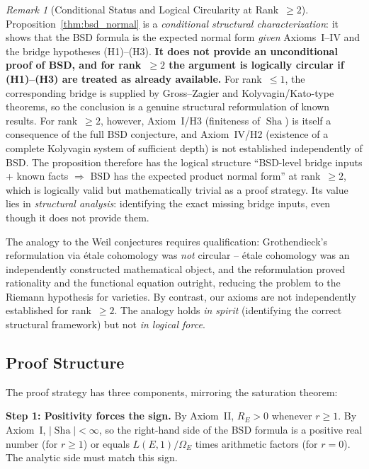 \documentclass[aps,prd,twocolumn,superscriptaddress,nofootinbib,floatfix]{revtex4-2}
\theoremstyle{definition}
\theoremstyle{remark}
\newtheorem{remark}[theorem]{Remark}
\DeclareMathOperator{\Sha}{Sha}
\begin{document}
\begin{remark}[Conditional Status and Logical Circularity at Rank~$\geq 2$]
\label{rem:conditional_status}
Proposition~\ref{thm:bsd_normal} is a \textit{conditional structural characterization}: it shows that the BSD formula is the expected normal form \textit{given} Axioms~I--IV and the bridge hypotheses (H1)--(H3). \textbf{It does not provide an unconditional proof of BSD, and for rank~$\geq 2$ the argument is logically circular if (H1)--(H3) are treated as already available.} For rank~$\leq 1$, the corresponding bridge is supplied by Gross--Zagier and Kolyvagin/Kato-type theorems, so the conclusion is a genuine structural reformulation of known results. For rank~$\geq 2$, however, Axiom~I/H3 (finiteness of $\Sha$) is itself a consequence of the full BSD conjecture, and Axiom~IV/H2 (existence of a complete Kolyvagin system of sufficient depth) is not established independently of BSD. The proposition therefore has the logical structure ``BSD-level bridge inputs + known facts $\Rightarrow$ BSD has the expected product normal form'' at rank~$\geq 2$, which is logically valid but mathematically trivial as a proof strategy. Its value lies in \textit{structural analysis}: identifying the exact missing bridge inputs, even though it does not provide them.

The analogy to the Weil conjectures requires qualification: Grothendieck's reformulation via étale cohomology was \textit{not} circular -- étale cohomology was an independently constructed mathematical object, and the reformulation proved rationality and the functional equation outright, reducing the problem to the Riemann hypothesis for varieties. By contrast, our axioms are not independently established for rank~$\geq 2$. The analogy holds \textit{in spirit} (identifying the correct structural framework) but not \textit{in logical force}.
\end{remark}

\subsection{Proof Structure}

The proof strategy has three components, mirroring the saturation theorem:

\textbf{Step 1: Positivity forces the sign.} By Axiom~II, $R_E > 0$ whenever $r \geq 1$. By Axiom~I, $|\Sha| < \infty$, so the right-hand side of the BSD formula is a positive real number (for $r \geq 1$) or equals $L(E,1)/\Omega_E$ times arithmetic factors (for $r = 0$). The analytic side must match this sign.
\end{document}
